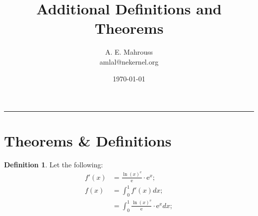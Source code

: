 \documentclass[10pt]{article}
\title{%
	\vspace{-1.5em}%
	\large\textbf{Additional Definitions and Theorems}%
}
\author{A. E. Mahrouss\\amlal@nekernel.org}
\date{\today}
\theoremstyle{plain}
\theoremstyle{definition}
\newtheorem{definition}[theorem]{Definition}
\theoremstyle{remark}
\begin{document}
	
	\maketitle
	\vspace{-0.5em}
	\vspace{0.8em}
	\rule{\linewidth}{0.4pt}
	\vspace{1em}
	
	\section{Theorems \& Definitions}
	
	\begin{definition}
		Let the following:
		\begin{align*}
			f'(x)&= \frac{\ln (x)^{\mathrm{e}}}{\mathrm{e}} \cdot \mathrm{e}^{x};\\
			f(x) &= \int_{0}^{1} f'(x)dx;\\
			&= \int_{0}^{1} \frac{\ln (x)^{\mathrm{e}}}{\mathrm{e}} \cdot \mathrm{e}^{x} dx;
		\end{align*}
	\end{definition}
	
	\nocite{*}
	
	
	
	
\end{document}
